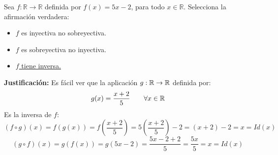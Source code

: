\documentclass[12pt]{article}
\begin{document}
    \begin{ejercicio}
        Sea $f:\mathbb{R} \rightarrow \mathbb{R}$ definida por $f(x) = 5x -2$, para todo $x \in \mathbb{R}$. Selecciona la afirmación verdadera:
        \begin{itemize}
            \item $f$ es inyectiva no sobreyectiva.
            \item $f$ es sobreyectiva no inyectiva.
            \item \underline{$f$ tiene inversa.}
        \end{itemize}
        \textbf{Justificación:}\newline
        Es fácil ver que la aplicación $g:\mathbb{R}\rightarrow \mathbb{R}$ definida por:
        $$g(x) = \dfrac{x+2}{5}~~~~~~\forall x \in \mathbb{R}$$
        Es la inversa de $f$:
        $$(f \circ g)(x) = f(g(x)) = f\left(\dfrac{x+2}{5}\right) = 5\left(\dfrac{x+2}{5}\right)-2 = (x+2)-2 = x = Id(x)$$
        $$(g \circ f)(x) = g(f(x)) = g(5x-2) = \dfrac{5x-2+2}{5} = \dfrac{5x}{5} = x = Id(x)$$
    \end{ejercicio}
\end{document}
